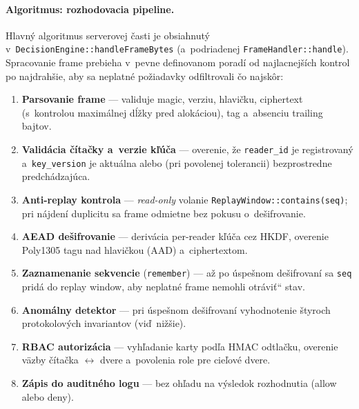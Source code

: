 \documentclass[a4paper]{feidipsp}
\providecommand{\uv}[1]{\quotedblbase#1\textquotedblleft}
\begin{document}
\paragraph{Algoritmus: rozhodovacia pipeline.}

Hlavný algoritmus serverovej časti je obsiahnutý v~\texttt{DecisionEngine::handleFrameBytes} (a~podriadenej \texttt{FrameHandler::handle}). Spracovanie frame prebieha v~pevne definovanom poradí od najlacnejších kontrol po najdrahšie, aby sa neplatné požiadavky odfiltrovali čo najskôr:

\begin{enumerate}
\item \textbf{Parsovanie frame} --- validuje magic, verziu, hlavičku, ciphertext (s~kontrolou maximálnej dĺžky pred alokáciou), tag a~absenciu trailing bajtov.
\item \textbf{Validácia čítačky a~verzie kľúča} --- overenie, že \texttt{reader\_id} je registrovaný a~\texttt{key\_version} je aktuálna alebo (pri povolenej tolerancii) bezprostredne predchádzajúca.
\item \textbf{Anti-replay kontrola} --- \emph{read-only} volanie \texttt{ReplayWindow::contains(seq)}; pri nájdení duplicitu sa frame odmietne bez pokusu o~dešifrovanie.
\item \textbf{AEAD dešifrovanie} --- derivácia per-reader kľúča cez HKDF, overenie Poly1305 tagu nad hlavičkou (AAD) a~ciphertextom.
\item \textbf{Zaznamenanie sekvencie} (\texttt{remember}) --- až po úspešnom dešifrovaní sa \texttt{seq} pridá do replay window, aby neplatné frame nemohli \uv{otráviť} stav.
\item \textbf{Anomálny detektor} --- pri úspešnom dešifrovaní vyhodnotenie štyroch protokolových invariantov (viď~nižšie).
\item \textbf{RBAC autorizácia} --- vyhľadanie karty podľa HMAC odtlačku, overenie väzby čítačka $\leftrightarrow$ dvere a~povolenia role pre cieľové dvere.
\item \textbf{Zápis do auditného logu} --- bez ohľadu na výsledok rozhodnutia (allow alebo deny).
\end{enumerate}
\end{document}
